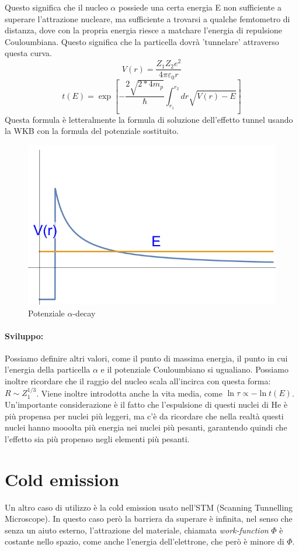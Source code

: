 Questo significa che il nucleo $\alpha$ possiede una certa energia E non sufficiente a superare l'attrazione nucleare, ma sufficiente a trovarsi a qualche femtometro di distanza, dove con la propria energia riesce a matchare l'energia di repulsione Couloumbiana. Questo significa che la particella dovrà 'tunnelare' attraverso questa curva.
$$V(r) = \frac{Z_1Z_2e^2}{4\pi\varepsilon_0r}$$ 
$$t(E) = \exp \left[ -\frac{2\sqrt{2*4m_p}}{\hbar} \int_{r_1}^{r_2} dr\sqrt{V(r) - E} \right]$$ 
Questa formula è letteralmente la formula di soluzione dell'effetto tunnel usando la WKB con la formula del potenziale sostituito.

\begin{figure}[ht]
	\centering
	\includegraphics[width=.5\textwidth]{../images/Screenshot 2025-02-17 144907.png}
	\caption{Potenziale $\alpha$-decay}
	\label{fig:alpha_decay}
\end{figure}

\paragraph{Sviluppo:}
Possiamo definire altri valori, come il punto di massima energia, il punto in cui l'energia della particella $\alpha$ e il potenziale Couloumbiano si ugualiano. Possiamo inoltre ricordare che il raggio del nucleo scala all'incirca con questa forma: $R \sim Z_1^{1/3}$. Viene inoltre introdotta anche la vita media, come $\ln{\tau} \propto -\ln t(E)$.
Un'importante considerazione è il fatto che l'espulsione di questi nuclei di He è più propensa per nuclei più leggeri, ma c'è da ricordare che nella realtà questi nuclei hanno mooolta più energia nei nuclei più pesanti, garantendo quindi che l'effetto sia più propenso negli elementi più pesanti.

\section{Cold emission}
Un altro caso di utilizzo è la cold emission usato nell'STM (Scanning Tunnelling Microscope). In questo caso però la barriera da superare è infinita, nel senso che senza un aiuto esterno, l'attrazione del materiale, chiamata \textit{work-function} $\Phi$ è costante nello spazio, come anche l'energia dell'elettrone, che però è minore di $\Phi$.

